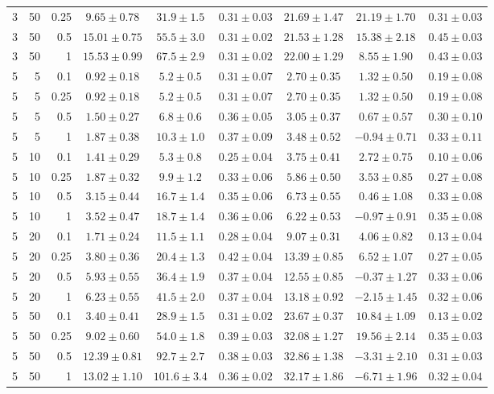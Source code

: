 \begin{table}[htbp]
\begin{tabular}{@{}rrrcccccc@{}}
3 & 50 & 0.25 & $9.65 \pm 0.78$ & $31.9 \pm 1.5$ & $0.31 \pm 0.03$ & $21.69 \pm 1.47$ & $21.19 \pm 1.70$ & $0.31 \pm 0.03$ \\
3 & 50 & 0.5 & $15.01 \pm 0.75$ & $55.5 \pm 3.0$ & $0.31 \pm 0.02$ & $21.53 \pm 1.28$ & $15.38 \pm 2.18$ & $0.45 \pm 0.03$ \\
3 & 50 & 1 & $15.53 \pm 0.99$ & $67.5 \pm 2.9$ & $0.31 \pm 0.02$ & $22.00 \pm 1.29$ & $8.55 \pm 1.90$ & $0.43 \pm 0.03$ \\
\midrule
5 & 5 & 0.1 & $0.92 \pm 0.18$ & $5.2 \pm 0.5$ & $0.31 \pm 0.07$ & $2.70 \pm 0.35$ & $1.32 \pm 0.50$ & $0.19 \pm 0.08$ \\
5 & 5 & 0.25 & $0.92 \pm 0.18$ & $5.2 \pm 0.5$ & $0.31 \pm 0.07$ & $2.70 \pm 0.35$ & $1.32 \pm 0.50$ & $0.19 \pm 0.08$ \\
5 & 5 & 0.5 & $1.50 \pm 0.27$ & $6.8 \pm 0.6$ & $0.36 \pm 0.05$ & $3.05 \pm 0.37$ & $0.67 \pm 0.57$ & $0.30 \pm 0.10$ \\
5 & 5 & 1 & $1.87 \pm 0.38$ & $10.3 \pm 1.0$ & $0.37 \pm 0.09$ & $3.48 \pm 0.52$ & $-0.94 \pm 0.71$ & $0.33 \pm 0.11$ \\
5 & 10 & 0.1 & $1.41 \pm 0.29$ & $5.3 \pm 0.8$ & $0.25 \pm 0.04$ & $3.75 \pm 0.41$ & $2.72 \pm 0.75$ & $0.10 \pm 0.06$ \\
5 & 10 & 0.25 & $1.87 \pm 0.32$ & $9.9 \pm 1.2$ & $0.33 \pm 0.06$ & $5.86 \pm 0.50$ & $3.53 \pm 0.85$ & $0.27 \pm 0.08$ \\
5 & 10 & 0.5 & $3.15 \pm 0.44$ & $16.7 \pm 1.4$ & $0.35 \pm 0.06$ & $6.73 \pm 0.55$ & $0.46 \pm 1.08$ & $0.33 \pm 0.08$ \\
5 & 10 & 1 & $3.52 \pm 0.47$ & $18.7 \pm 1.4$ & $0.36 \pm 0.06$ & $6.22 \pm 0.53$ & $-0.97 \pm 0.91$ & $0.35 \pm 0.08$ \\
5 & 20 & 0.1 & $1.71 \pm 0.24$ & $11.5 \pm 1.1$ & $0.28 \pm 0.04$ & $9.07 \pm 0.31$ & $4.06 \pm 0.82$ & $0.13 \pm 0.04$ \\
5 & 20 & 0.25 & $3.80 \pm 0.36$ & $20.4 \pm 1.3$ & $0.42 \pm 0.04$ & $13.39 \pm 0.85$ & $6.52 \pm 1.07$ & $0.27 \pm 0.05$ \\
5 & 20 & 0.5 & $5.93 \pm 0.55$ & $36.4 \pm 1.9$ & $0.37 \pm 0.04$ & $12.55 \pm 0.85$ & $-0.37 \pm 1.27$ & $0.33 \pm 0.06$ \\
5 & 20 & 1 & $6.23 \pm 0.55$ & $41.5 \pm 2.0$ & $0.37 \pm 0.04$ & $13.18 \pm 0.92$ & $-2.15 \pm 1.45$ & $0.32 \pm 0.06$ \\
5 & 50 & 0.1 & $3.40 \pm 0.41$ & $28.9 \pm 1.5$ & $0.31 \pm 0.02$ & $23.67 \pm 0.37$ & $10.84 \pm 1.09$ & $0.13 \pm 0.02$ \\
5 & 50 & 0.25 & $9.02 \pm 0.60$ & $54.0 \pm 1.8$ & $0.39 \pm 0.03$ & $32.08 \pm 1.27$ & $19.56 \pm 2.14$ & $0.35 \pm 0.03$ \\
5 & 50 & 0.5 & $12.39 \pm 0.81$ & $92.7 \pm 2.7$ & $0.38 \pm 0.03$ & $32.86 \pm 1.38$ & $-3.31 \pm 2.10$ & $0.31 \pm 0.03$ \\
5 & 50 & 1 & $13.02 \pm 1.10$ & $101.6 \pm 3.4$ & $0.36 \pm 0.02$ & $32.17 \pm 1.86$ & $-6.71 \pm 1.96$ & $0.32 \pm 0.04$ \\
\bottomrule
\end{tabular}
\end{table}
